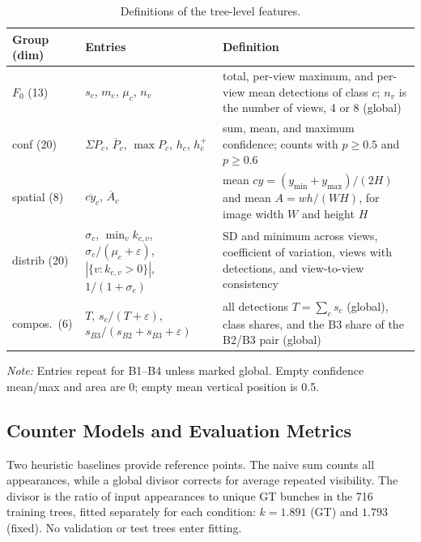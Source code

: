 \documentclass[conference,a4paper]{IEEEtran}
\begin{document}
\begin{table}[!tb]
  \centering
  \footnotesize
  \renewcommand{\arraystretch}{1.13}
  \setlength{\tabcolsep}{3pt}
  \caption{Definitions of the tree-level features.}
  \label{tab:features}
  \begin{tabular}{@{}l>{\raggedright\arraybackslash}p{}>{\raggedright\arraybackslash}p{}@{}}
    \toprule
    Group (dim) & Entries & Definition \\
    \midrule
    $F_0$ (13) & $s_c$, $m_c$, $\mu_c$, $n_v$
      & total, per-view maximum, and per-view mean detections of class $c$;
        $n_v$ is the number of views, 4 or 8 (global) \\
    \addlinespace[2pt]
    conf (20) & $\Sigma P_c$, $\overline{P}_c$, $\max P_c$, $h_c$, $h^{+}_c$
      & sum, mean, and maximum confidence; counts with $p \ge 0.5$ and
        $p \ge 0.6$ \\
    \addlinespace[2pt]
    spatial (8) & $\overline{cy}_c$, $\overline{A}_c$
      & mean $cy=(y_{\min}+y_{\max})/(2H)$ and mean
        $A=wh/(WH)$, for image width $W$ and height $H$ \\
    \addlinespace[2pt]
    distrib (20) & $\sigma_c$, $\min_v k_{c,v}$,
      $\sigma_c/(\mu_c{+}\varepsilon)$, $|\{v\!:\!k_{c,v}{>}0\}|$,
      $1/(1{+}\sigma_c)$
      & SD and minimum across views, coefficient of variation, views with
        detections, and view-to-view consistency \\
    \addlinespace[2pt]
    compos.\ (6) & $T$, $s_c/(T{+}\varepsilon)$,
      $s_{B3}/(s_{B2}{+}s_{B3}{+}\varepsilon)$
      & all detections $T=\sum_c s_c$ (global), class shares, and the B3 share
        of the B2/B3 pair (global) \\
    \bottomrule
  \end{tabular}
\par\vspace{3pt}
  \begin{minipage}{\columnwidth}
    \footnotesize\raggedright
    \textit{Note:} Entries repeat for B1--B4 unless marked global. Empty confidence mean/max and area are 0; empty mean vertical position is 0.5.
  \end{minipage}
\end{table}

\subsection{Counter Models and Evaluation Metrics}
Two heuristic baselines provide reference points. The naive sum counts all
appearances, while a global divisor corrects for average repeated visibility.
The divisor is the ratio of input appearances to unique GT bunches in the
716 training trees, fitted separately for each condition:
$k=1.891$ (GT) and $1.793$ (fixed). No validation or test trees enter fitting.
\end{document}

